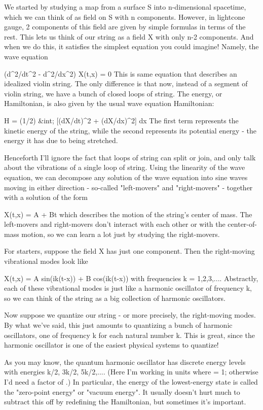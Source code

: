 We started by studying a map from a surface S into n-dimensional
spacetime, which we can think of as field on S with n components. 
However, in lightcone gauge, 2 components of this field are given by
simple formulas in terms of the rest.  This lets us think of our string
as a field X with only n-2 components.  And when we do this, it
satisfies the simplest equation you could imagine!  Namely, the wave
equation

  (d^{2}/dt^{2} - d^{2}/dx^{2}) X(t,x) = 0
This is same equation that describes an idealized violin string.   The
only difference is that now, instead of a segment of violin string, we
have a bunch of closed loops of string.  The energy, or Hamiltonian,
is also given by the usual wave equation Hamiltonian:

  H = (1/2) &int; [(dX/dt)^{2} + (dX/dx)^{2}] dx
The first term represents the kinetic energy of the string, while
the second represents its potential energy - the energy it has due
to being stretched.

Henceforth I'll ignore the fact that loops of string can split or join,
and only talk about the vibrations of a single loop of string.  Using
the linearity of the wave equation, we can decompose any solution of the
wave equation into sine waves moving in either direction - so-called 
"left-movers" and "right-movers" - together with a solution of the form

                         X(t,x) = A + Bt
which describes the motion of the string's center of mass.  The
left-movers and right-movers don't interact with each other or
with the center-of-mass motion, so we can learn a lot just by studying
the right-movers.  

For starters, suppose the field X has just one component.  Then the
right-moving vibrational modes look like

              X(t,x) = A sin(ik(t-x)) + B cos(ik(t-x))
with frequencies k = 1,2,3,....  Abstractly, each of these vibrational
modes is just like a harmonic oscillator of frequency k, so we can think
of the string as a big collection of harmonic oscillators.  

Now suppose we quantize our string - or more precisely, the right-moving
modes.  By what we've said, this just amounts to quantizing a bunch of 
harmonic oscillators, one of frequency k for each natural number k.  This
is great, since the harmonic oscillator is one of the easiest physical
systems to quantize!  

As you may know, the quantum harmonic oscillator has discrete energy
levels with energies k/2, 3k/2, 5k/2,....  (Here I'm working in units
where \hbar  = 1; otherwise I'd need a factor of \hbar .)  In particular,
the energy of the lowest-energy state is called the "zero-point
energy" or "vacuum energy".  It usually doesn't hurt much
to subtract this off by redefining the Hamiltonian, but sometimes it's
important.

